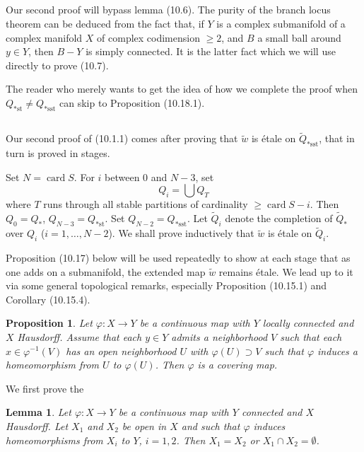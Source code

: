 \documentclass[12pt,a4paper]{article}
\theoremstyle{plain}
\newtheorem{lemma}[theorem]{Lemma}
\newtheorem{proposition}[theorem]{Proposition}
\theoremstyle{definition}
\theoremstyle{remark}
\DeclareMathOperator{\card}{card}
\begin{document}
\subsection{}
\label{10.9}

Our second proof will bypass lemma (10.6). The purity of the branch locus theorem can be deduced from the fact that, if $Y$ is a complex submanifold of a complex manifold $X$ of complex codimension $\geqslant 2$, and $B$ a small ball around $y \in Y$, then $B - Y$ is simply connected. It is the latter fact which we will use directly to prove (10.7).

The reader who merely wants to get the idea of how we complete the proof when $Q_{*\text{st}} \neq Q_{*\text{sst}}$ can skip to Proposition (10.18.1).

\subsection{}
\label{10.10}

Our second proof of (10.1.1) comes after proving that $\widetilde{w}$ is \'etale on $\widetilde{Q}_{*\text{sst}}$, that in turn is proved in stages.

Set $N = \card S$. For $i$ between $0$ and $N - 3$, set
\[
Q_i = \bigcup Q_T
\]
where $T$ runs through all stable partitions of cardinality $\geqslant \card S - i$. Then $Q_0 = Q_*$, $Q_{N-3} = Q_{*\text{st}}$. Set $Q_{N-2} = Q_{*\text{sst}}$. Let $\widetilde{Q}_i$ denote the completion of $\widetilde{Q}_*$ over $Q_i$ ($i = 1, \ldots, N - 2$). We shall prove inductively that $\widetilde{w}$ is \'etale on $\widetilde{Q}_i$.

Proposition (10.17) below will be used repeatedly to show at each stage that as one adds on a submanifold, the extended map $\widetilde{w}$ remains \'etale. We lead up to it via some general topological remarks, especially Proposition (10.15.1) and Corollary (10.15.4).

\begin{proposition}
\label{10.11}
Let $\varphi : X \to Y$ be a continuous map with $Y$ locally connected and $X$ Hausdorff. Assume that each $y \in Y$ admits a neighborhood $V$ such that each $x \in \varphi^{-1}(V)$ has an open neighborhood $U$ with $\varphi(U) \supset V$ such that $\varphi$ induces a homeomorphism from $U$ to $\varphi(U)$. Then $\varphi$ is a covering map.
\end{proposition}

We first prove the

\begin{lemma}
\label{10.11.1}
Let $\varphi : X \to Y$ be a continuous map with $Y$ connected and $X$ Hausdorff. Let $X_1$ and $X_2$ be open in $X$ and such that $\varphi$ induces homeomorphisms from $X_i$ to $Y$, $i = 1, 2$. Then $X_1 = X_2$ or $X_1 \cap X_2 = \emptyset$.
\end{lemma}
\end{document}
